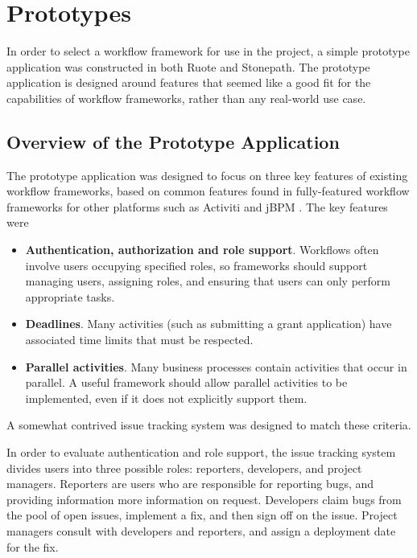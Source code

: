 \documentclass[document.tex]{subfiles}
\begin{document}
\chapter {Prototypes}
\label {ch:prototypes}

In order to select a workflow framework for use in the project, a simple prototype application was constructed in both Ruote and Stonepath. The prototype application is designed around features that seemed like a good fit for the capabilities of workflow frameworks, rather than any real-world use case.


\section {Overview of the Prototype Application}
\label {sec:overview-of-the-prototype-application}

The prototype application was designed to focus on three key features of existing workflow frameworks, based on common features found in fully-featured workflow frameworks for other platforms such as Activiti and jBPM \cite{jbpm}. The key features were

\begin{itemize}
\item \textbf{Authentication, authorization and role support}. Workflows often involve users occupying specified roles, so frameworks should support managing users, assigning roles, and ensuring that users can only perform appropriate tasks.
\item \textbf{Deadlines}. Many activities (such as submitting a grant application) have associated time limits that must be respected.
\item \textbf{Parallel activities}. Many business processes contain activities that occur in parallel. A useful framework should allow parallel activities to be implemented, even if it does not explicitly support them.
\end{itemize}

A somewhat contrived issue tracking system was designed to match these criteria.

In order to evaluate authentication and role support, the issue tracking system divides users into three possible roles: reporters, developers, and project managers. Reporters are users who are responsible for reporting bugs, and providing information more information on request. Developers claim bugs from the pool of open issues, implement a fix, and then sign off on the issue. Project managers consult with developers and reporters, and assign a deployment date for the fix.
\end{document}
